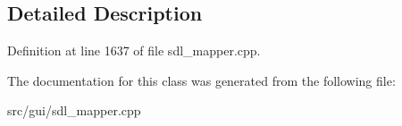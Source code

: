 \subsection{Detailed Description}


Definition at line 1637 of file sdl\-\_\-mapper.\-cpp.



The documentation for this class was generated from the following file\-:\begin{DoxyCompactItemize}
\item 
src/gui/sdl\-\_\-mapper.\-cpp\end{DoxyCompactItemize}
